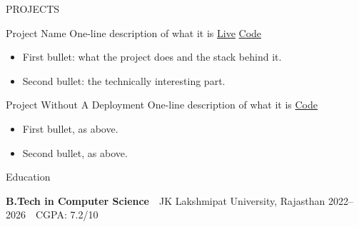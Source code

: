 \documentclass{resume} %
\begin{document}
\begin{rSection}{PROJECTS}

\setlength{\parskip}{6pt}
\setlength{\parindent}{2pt}

\projectHeading
{Project Name}
{One-line description of what it is}
{\href{https://example.com/}{Live}}
{\href{https://github.com/Riyanshverma/repository}{Code}}

\begin{itemize}
\itemsep -3pt {}

\item First bullet: what the project does and the stack behind it.

\item Second bullet: the technically interesting part.

\end{itemize}

\projectHeading
{Project Without A Deployment}
{One-line description of what it is}
{}
{\href{https://github.com/Riyanshverma/repository}{Code}}

\begin{itemize}
\itemsep -3pt {}

\item First bullet, as above.

\item Second bullet, as above.

\end{itemize}

\end{rSection}


\begin{rSection}{Education}

\textbf{B.Tech in Computer Science}
\,\textbar\,
JK Lakshmipat University, Rajasthan
\hfill
2022--2026
\,\textbar\,
CGPA: 7.2/10

\end{rSection}


%
%
%
%
%
%

\end{document}
